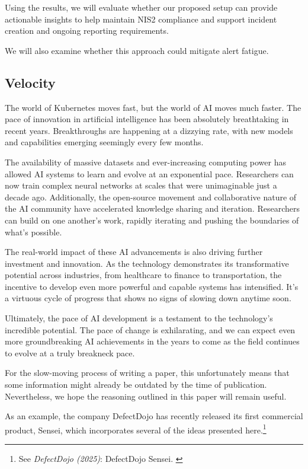 Using the results, we will evaluate whether our proposed setup can provide actionable insights to help maintain NIS2 compliance and support incident creation and ongoing reporting requirements.

We will also examine whether this approach could mitigate alert fatigue.

\subsection{Velocity}\label{velocity}

The world of Kubernetes moves fast, but the world of AI moves much faster. The pace of innovation in artificial intelligence has been absolutely breathtaking in recent years. Breakthroughs are happening at a dizzying rate, with new models and capabilities emerging seemingly every few months.

The availability of massive datasets and ever-increasing computing power has allowed AI systems to learn and evolve at an exponential pace. Researchers can now train complex neural networks at scales that were unimaginable just a decade ago. Additionally, the open-source movement and collaborative nature of the AI community have accelerated knowledge sharing and iteration. Researchers can build on one another's work, rapidly iterating and pushing the boundaries of what's possible.

The real-world impact of these AI advancements is also driving further investment and innovation. As the technology demonstrates its transformative potential across industries, from healthcare to finance to transportation, the incentive to develop even more powerful and capable systems has intensified. It's a virtuous cycle of progress that shows no signs of slowing down anytime soon.

Ultimately, the pace of AI development is a testament to the technology's incredible potential. The pace of change is exhilarating, and we can expect even more groundbreaking AI achievements in the years to come as the field continues to evolve at a truly breakneck pace. 

For the slow-moving process of writing a paper, this unfortunately means that some information might already be outdated by the time of publication. Nevertheless, we hope the reasoning outlined in this paper will remain useful.

As an example, the company DefectDojo has recently released its first commercial product, Sensei, which incorporates several of the ideas presented here.\footnote{See \textit{DefectDojo (2025)}: DefectDojo Sensei. \cite{senseiDD}}

